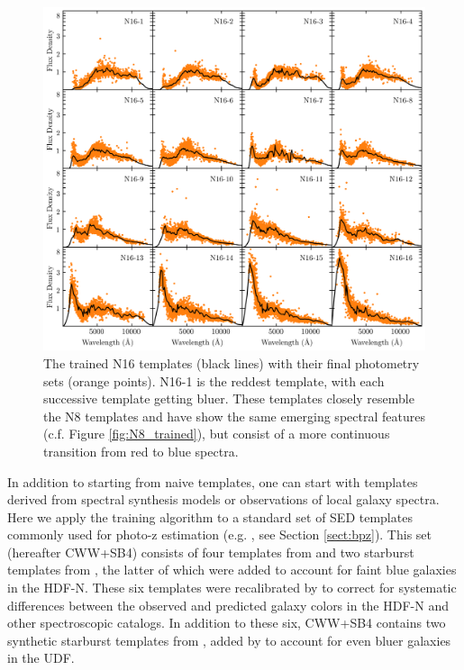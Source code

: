 \begin{figure}
    \centering
    \includegraphics{figures/N16_trained.png}
    \caption{The trained N16 templates (black lines) with their final photometry sets (orange points). N16-1 is the reddest template, with each successive template getting bluer. These templates closely resemble the N8 templates and have show the same emerging spectral features (c.f. Figure \ref{fig:N8_trained}), but consist of a more continuous transition from red to blue spectra.}
    \label{fig:N16_trained}
\end{figure}

In addition to starting from naive templates, one can start with templates derived from spectral synthesis models or observations of local galaxy spectra. 
Here we apply the training algorithm to a standard set of SED templates commonly used for photo-z estimation (e.g. \bpz, see Section \ref{sect:bpz}).
This set (hereafter CWW+SB4) consists of four templates from \citet{Coleman1980a} and two starburst templates from \citet{Kinney1996a}, the latter of which were added to account for faint blue galaxies in the HDF-N. 
These six templates were recalibrated by \citet{Benitez2004a} to correct for systematic differences between the observed and predicted galaxy colors in the HDF-N and other spectroscopic catalogs. 
In addition to these six, CWW+SB4 contains two synthetic starburst templates from \citet{Bruzual2003b}, added by \citet{Coe2006a} to account for even bluer galaxies in the UDF.

